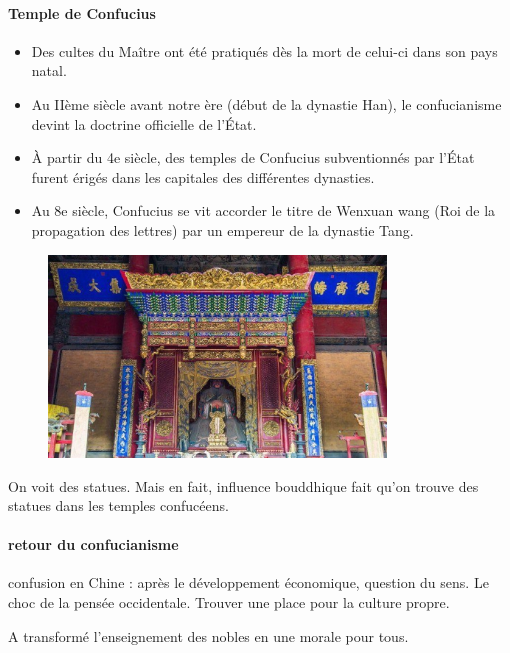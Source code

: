 \paragraph{Temple de Confucius}
\begin{itemize}
    \item  Des cultes du Maître ont été pratiqués dès la mort de celui-ci dans son pays natal.
  \item 	Au IIème siècle avant notre ère (début de la dynastie Han), le confucianisme devint la doctrine officielle de l’État.
  \item À partir du 4e siècle, des temples de Confucius subventionnés par l’État furent érigés dans les capitales des différentes dynasties.
  \item Au 8e siècle, Confucius se vit accorder le titre de Wenxuan wang (Roi de la propagation des lettres) par un empereur de la dynastie Tang.

\end{itemize}
\begin{Ex}


    \begin{figure}[!h]
    \centering
    \includegraphics[width=0.8\textwidth]{ConfucianismeTaoismeBouddhismeChinois/Images/TempleConfucius.jpg}

    \label{fig:enter-label}
\end{figure}
    On voit des statues. Mais en fait, influence bouddhique fait qu'on trouve des statues dans les temples confucéens.
\end{Ex}
\paragraph{retour du confucianisme} confusion en Chine : après le développement économique, question du sens. Le choc de la pensée occidentale. Trouver une place pour la culture propre. 


\begin{Synthesis}
    A transformé l'enseignement des nobles en une morale pour tous.
\end{Synthesis}